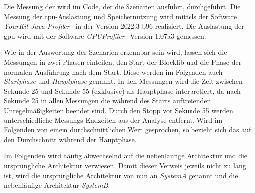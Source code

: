 Die Messung der \si{\fps} wird im Code, der die Szenarien ausführt, durchgeführt. Die Messung der \ac{cpu}-Auslastung und Speichernutzung wird mittels der Software \emph{YourKit Java Profiler}~\cite{YourKitGmbH} in der Version 2022.3-b96 realisiert. Die Auslastung der \ac{gpu} wird mit der Software \emph{GPUProfiler}~\cite{Main2021} Version 1.07a3 gemessen. 

Wie in der Auswertung der Szenarien erkennbar sein wird, lassen sich die Messungen in zwei Phasen einteilen, den Start der Blocklib und die Phase der normalen Ausführung nach dem Start. Diese werden im Folgenden auch \emph{Startphase} und \emph{Hauptphase} genannt. In den Messungen wird die Zeit zwischen Sekunde 25 und Sekunde 55 (exklusive) als Hauptphase interpretiert, da nach Sekunde 25 in allen Messungen die während des Starts auftretenden Unregelmäßigkeiten beendet sind. Durch den Stopp vor Sekunde 55 werden unterschiedliche Messungs-Endzeiten aus der Analyse entfernt. Wird im Folgenden von einem durchschnittlichen Wert gesprochen, so bezieht sich das auf den Durchschnitt während der Hauptphase.

Im Folgenden wird häufig abwechselnd auf die nebenläufige Architektur und die ursprüngliche Architektur verwiesen. Damit dieser Verweis jeweils nicht zu lang ist, wird die ursprüngliche Architektur von nun an \emph{SystemA} genannt und die nebenläufige Architektur \emph{SystemB}.